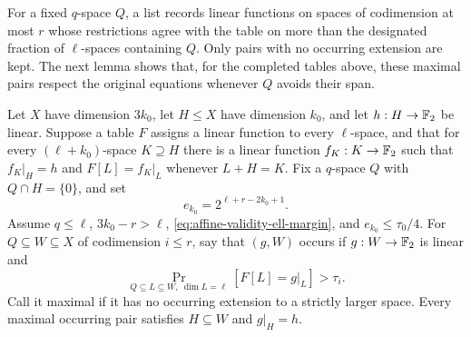 For a fixed $q$-space $Q$, a list records linear functions on spaces
of codimension at most $r$ whose restrictions agree with the table on
more than the designated fraction of $\ell$-spaces containing $Q$.
Only pairs with no occurring extension are kept.  The next lemma
shows that, for the completed tables above, these maximal pairs
respect the original equations whenever $Q$ avoids their span.

\begin{lemma}
\label{lem:affine-validity-invariance}
Let $X$ have dimension $3k_0$, let $H\le X$ have dimension $k_0$,
and let $h:H\to\mathbb F_2$ be linear.  Suppose a table $F$ assigns a linear
function to every $\ell$-space, and that for every
$(\ell+k_0)$-space $K\supseteq H$ there is a linear function
$f_K:K\to\mathbb F_2$ such that $f_K|_H=h$ and
$F[L]=f_K|_L$ whenever $L+H=K$.
Fix a $q$-space $Q$ with $Q\cap H=\{0\}$, and set
\[
  e_{k_0}=2^{\ell+r-2k_0+1}.
\]
Assume $q\le\ell$, $3k_0-r>\ell$, \eqref{eq:affine-validity-ell-margin},
and $e_{k_0}\le\tau_0/4$.
For $Q\subseteq W\subseteq X$ of codimension $i\le r$, say that
$(g,W)$ occurs if $g:W\to\mathbb F_2$ is linear and
\[
  \Pr_{Q\subseteq L\subseteq W,\ \dim L=\ell}
       [F[L]=g|_L]>\tau_i.
\]
Call it maximal if it has no occurring extension to a strictly larger
space.  Every maximal occurring pair satisfies $H\subseteq W$ and
$g|_H=h$.
\end{lemma}

